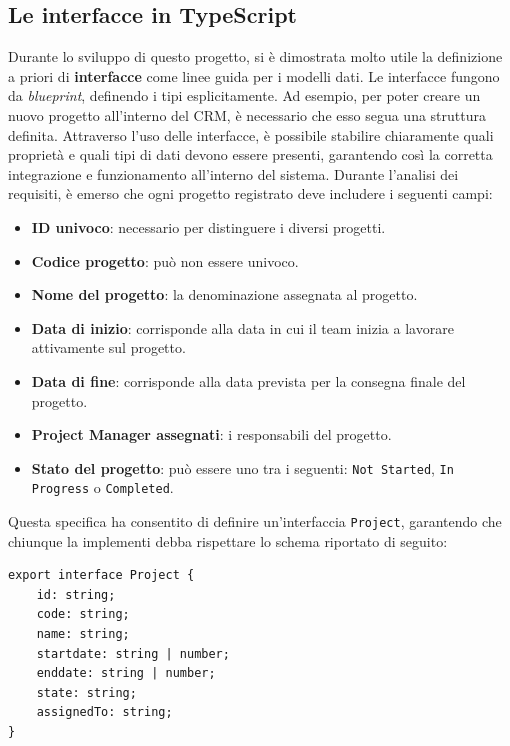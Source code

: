 \documentclass[target=bach,aauheader=,style=]{thud}
\begin{document}
\subsection{Le interfacce in TypeScript}
Durante lo sviluppo di questo progetto, si è dimostrata molto utile la definizione a priori di \textbf{interfacce} come linee guida per i modelli dati. Le interfacce fungono da \textit{blueprint}, definendo i tipi esplicitamente. Ad esempio, per poter creare un nuovo progetto all'interno del CRM, è necessario che esso segua una struttura definita. Attraverso l'uso delle interfacce, è possibile stabilire chiaramente quali proprietà e quali tipi di dati devono essere presenti, garantendo così la corretta integrazione e funzionamento all'interno del sistema. Durante l'analisi dei requisiti, è emerso che ogni progetto registrato deve includere i seguenti campi:

\begin{itemize}
    \item \textbf{ID univoco}: necessario per distinguere i diversi progetti.
    \item \textbf{Codice progetto}: può non essere univoco.
    \item \textbf{Nome del progetto}: la denominazione assegnata al progetto.
    \item \textbf{Data di inizio}: corrisponde alla data in cui il team inizia a lavorare attivamente sul progetto.
    \item \textbf{Data di fine}: corrisponde alla data prevista per la consegna finale del progetto.
    \item \textbf{Project Manager assegnati}: i responsabili del progetto.
    \item \textbf{Stato del progetto}: può essere uno tra i seguenti: \texttt{Not Started}, \texttt{In Progress} o \texttt{Completed}.
    
\end{itemize}

\noindent Questa specifica ha consentito di definire un'interfaccia \texttt{Project}, garantendo che chiunque la implementi debba rispettare lo schema riportato di seguito:

\begin{lstlisting}[language=React, caption=Interfaccia di progetto]
export interface Project {
    id: string;
    code: string;
    name: string;
    startdate: string | number;
    enddate: string | number;
    state: string;
    assignedTo: string;
}
\end{lstlisting}
\end{document}
